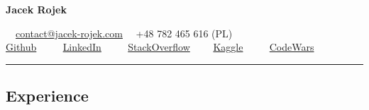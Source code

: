 \documentclass[10pt,letterpaper]{article}
\begin{document}
\begin{center}
	{\LARGE \textbf{Jacek Rojek}}
\end{center}
\begin{center}
	\ \ \href{mailto:contact@jacek-rojek.com}{contact@jacek-rojek.com}
	\ \ +48	782 465 616 (PL)\ \
	\\
	\href{https://github.com/JacekRojek}{Github} \ \ \textbullet
	\ \ \href{https://www.linkedin.com/in/jacek-rojek-b7a396105/}{LinkedIn} \ \ \textbullet
	\ \ \href{https://stackoverflow.com/users/4375103/jacek-rojek}{StackOverflow}\ \ \textbullet
	\ \ \href{https://www.kaggle.com/jacek123}{Kaggle} \ \ \textbullet
	\ \ \href{https://www.codewars.com/users/JacekRojek}{CodeWars}

\end{center}

\hrule
\vspace{-0.4em}
\subsection*{Experience}
\end{document}
